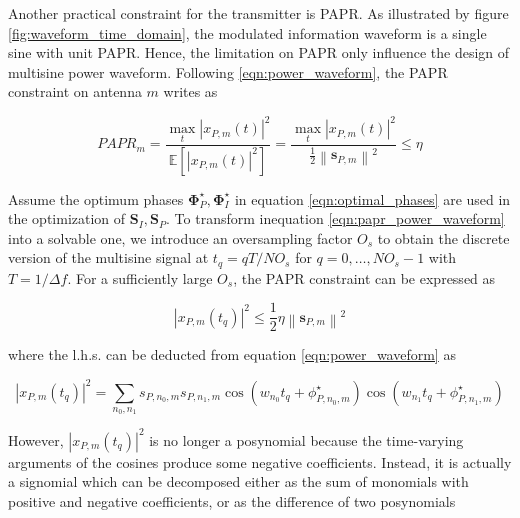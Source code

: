 Another practical constraint for the transmitter is PAPR. As illustrated by figure \ref{fig:waveform_time_domain}, the modulated information waveform is a single sine with unit PAPR. Hence, the limitation on PAPR only influence the design of multisine power waveform. Following \ref{eqn:power_waveform}, the PAPR constraint on antenna $m$ writes as

\begin{equation}\label{eqn:papr_power_waveform}
  {PAPR_m} = \frac{{\mathop {\max }\limits_t {{\left| {{x_{P,m}}(t)} \right|}^2}}}{{\mathbb{E}\left[ {{{\left| {{x_{P,m}}(t)} \right|}^2}} \right]}} = \frac{{\mathop {\max }\limits_t {{\left| {{x_{P,m}}(t)} \right|}^2}}}{{\frac{1}{2}{{\left\| {{{\mathbf{s}}_{P,m}}} \right\|}^2}}} \leqslant \eta 
\end{equation}

Assume the optimum phases ${\mathbf{\Phi }}_P^ \star ,{\mathbf{\Phi }}_I^ \star $ in equation \ref{eqn:optimal_phases} are used in the optimization of ${{\mathbf{S}}_I},{{\mathbf{S}}_P}$. To transform inequation \ref{eqn:papr_power_waveform} into a solvable one, we introduce an oversampling factor ${O_s}$ to obtain the discrete version of the multisine signal at ${t_q} = qT/N{O_s}$ for $q = 0, \ldots ,N{O_s} - 1$ with $T = 1/\Delta f$. For a sufficiently large ${O_s}$, the PAPR constraint can be expressed as

\begin{equation}\label{eqn:papr_sample}
  {\left| {{x_{P,m}}\left( {{t_q}} \right)} \right|^2} \leqslant \frac{1}{2}\eta {\left\| {{{\mathbf{s}}_{P,m}}} \right\|^2}
\end{equation}

where the l.h.s. can be deducted from equation \ref{eqn:power_waveform} as

\begin{equation}\label{eqn:papr_average_sample}
  {\left| {{x_{P,m}}\left( {{t_q}} \right)} \right|^2} = \sum\limits_{{n_0},{n_1}} {{s_{P,{n_0},m}}{s_{P,{n_1},m}}\cos \left( {{w_{{n_0}}}{t_q} + \phi _{P,{n_0},m}^ \star } \right)\cos \left( {{w_{{n_1}}}{t_q} + \phi _{P,{n_1},m}^ \star } \right)} 
\end{equation}

However, ${\left| {{x_{P,m}}\left( {{t_q}} \right)} \right|^2}$ is no longer a posynomial because the time-varying arguments of the cosines produce some negative coefficients. Instead, it is actually a signomial which can be decomposed either as the sum of monomials with positive and negative coefficients, or as the difference of two posynomials

